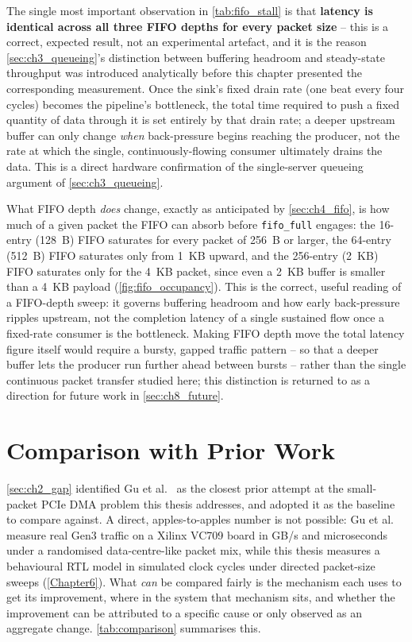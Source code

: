 The single most important observation in \autoref{tab:fifo_stall} is that \textbf{latency is identical across all three FIFO depths for every packet size} -- this is a correct, expected result, not an experimental artefact, and it is the reason \autoref{sec:ch3_queueing}'s distinction between buffering headroom and steady-state throughput was introduced analytically before this chapter presented the corresponding measurement. Once the sink's fixed drain rate (one beat every four cycles) becomes the pipeline's bottleneck, the total time required to push a fixed quantity of data through it is set entirely by that drain rate; a deeper upstream buffer can only change \emph{when} back-pressure begins reaching the producer, not the rate at which the single, continuously-flowing consumer ultimately drains the data. This is a direct hardware confirmation of the single-server queueing argument of \autoref{sec:ch3_queueing}.

What FIFO depth \emph{does} change, exactly as anticipated by \autoref{sec:ch4_fifo}, is how much of a given packet the FIFO can absorb before \texttt{fifo\_full} engages: the 16-entry (128~B) FIFO saturates for every packet of 256~B or larger, the 64-entry (512~B) FIFO saturates only from 1~KB upward, and the 256-entry (2~KB) FIFO saturates only for the 4~KB packet, since even a 2~KB buffer is smaller than a 4~KB payload (\autoref{fig:fifo_occupancy}). This is the correct, useful reading of a FIFO-depth sweep: it governs buffering headroom and how early back-pressure ripples upstream, not the completion latency of a single sustained flow once a fixed-rate consumer is the bottleneck. Making FIFO depth move the total latency figure itself would require a bursty, gapped traffic pattern -- so that a deeper buffer lets the producer run further ahead between bursts -- rather than the single continuous packet transfer studied here; this distinction is returned to as a direction for future work in \autoref{sec:ch8_future}.


\section{Comparison with Prior Work}
\label{sec:ch7_comparison}

\autoref{sec:ch2_gap} identified Gu et al.~\cite{gu2025cooptimization} as the closest prior attempt at the small-packet PCIe DMA problem this thesis addresses, and adopted it as the baseline to compare against. A direct, apples-to-apples number is not possible: Gu et al. measure real Gen3 traffic on a Xilinx VC709 board in GB/s and microseconds under a randomised data-centre-like packet mix, while this thesis measures a behavioural RTL model in simulated clock cycles under directed packet-size sweeps (\autoref{Chapter6}). What \emph{can} be compared fairly is the mechanism each uses to get its improvement, where in the system that mechanism sits, and whether the improvement can be attributed to a specific cause or only observed as an aggregate change. \autoref{tab:comparison} summarises this.


